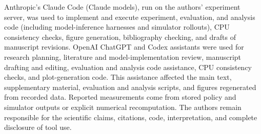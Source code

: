 Anthropic's Claude Code (Claude models), run on the authors' experiment server, was used to implement and execute experiment, evaluation, and analysis code (including model-inference harnesses and simulator rollouts), CPU consistency checks, figure generation, bibliography checking, and drafts of manuscript revisions. OpenAI ChatGPT and Codex assistants were used for research planning, literature and model-implementation review, manuscript drafting and editing, evaluation and analysis code assistance, CPU consistency checks, and plot-generation code. This assistance affected the main text, supplementary material, evaluation and analysis scripts, and figures regenerated from recorded data. Reported measurements come from stored policy and simulator outputs or explicit numerical recomputation. The authors remain responsible for the scientific claims, citations, code, interpretation, and complete disclosure of tool use.
